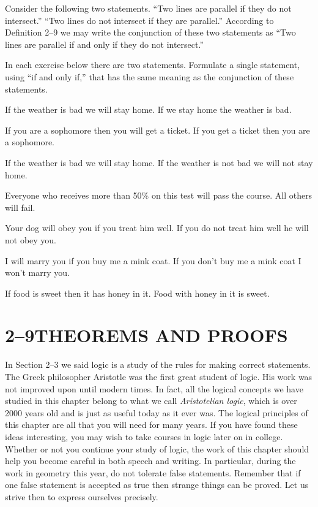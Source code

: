 \documentclass[11pt]{book}
\theoremstyle{bkplain}
\theoremstyle{XIplainnote}
\theoremstyle{bkplain}
\theoremstyle{bkplain}
\begin{document}
Consider the following two statements. ``Two lines are parallel if they do not
intersect.'' ``Two lines do not intersect if they are parallel.'' According to
Definition 2--9 we may write the conjunction of these two statements as ``Two
lines are parallel if and only if they do not intersect.''


In each exercise below there are two statements. Formulate a single statement,
using ``if and only if,'' that has the same meaning as the conjunction of these
statements.

\begin{exercisecols}
\begin{exlist}
\item If the weather is bad we will stay home. If we stay home the weather is bad.
\item If you are a sophomore then you will get a ticket. If you get a ticket then
      you are a sophomore.
\item If the weather is bad we will stay home. If the weather is not bad we will
      not stay home.
\item Everyone who receives more than 50\% on this test will pass the course. All
      others will fail.
\item Your dog will obey you if you treat him well. If you do not treat him well
      he will not obey you.
\item I will marry you if you buy me a mink coat. If you don't buy me a mink coat
      I won't marry you.
\item If food is sweet then it has honey in it. Food with honey in it is sweet.
\end{exlist}
\end{exercisecols}

\section*{2--9\quad THEOREMS AND PROOFS}

In Section 2--3 we said logic is a study of the rules for making correct
statements. The Greek philosopher Aristotle was the first great student of logic.
His work was not improved upon until modern times. In fact, all the logical
concepts we have studied in this chapter belong to what we call
\emph{Aristotelian logic}, which is over 2000 years old and is just as useful
today as it ever was. The logical principles of this chapter are all that you will
need for many years. If you have found these ideas interesting, you may wish to
take courses in logic later on in college. Whether or not you continue your study
of logic, the work of this chapter should help you become careful in both speech
and writing. In particular, during the work in geometry this year, do not tolerate
false statements. Remember that if one false statement is accepted as true then
strange things can be proved. Let us strive then to express ourselves precisely.
\end{document}
